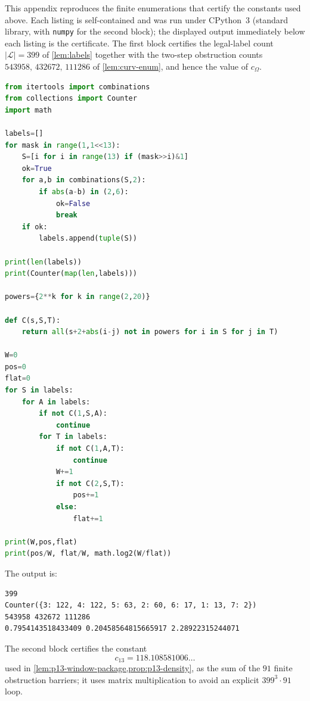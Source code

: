 \documentclass[11pt]{article}
\newcommand{\labels}{\mathcal L}
\begin{document}
This appendix reproduces the finite enumerations that certify the constants used above.  Each listing is self-contained and was run under CPython~3 (standard library, with \texttt{numpy} for the second block); the displayed output immediately below each listing is the certificate.  The first block certifies the legal-label count $|\labels|=399$ of \cref{lem:labels} together with the two-step obstruction counts $543958,\,432672,\,111286$ of \cref{lem:curv-enum}, and hence the value of $c_\Omega$.

\begin{lstlisting}[language=Python]
from itertools import combinations
from collections import Counter
import math

labels=[]
for mask in range(1,1<<13):
    S=[i for i in range(13) if (mask>>i)&1]
    ok=True
    for a,b in combinations(S,2):
        if abs(a-b) in (2,6):
            ok=False
            break
    if ok:
        labels.append(tuple(S))

print(len(labels))
print(Counter(map(len,labels)))

powers={2**k for k in range(2,20)}

def C(s,S,T):
    return all(s+2+abs(i-j) not in powers for i in S for j in T)

W=0
pos=0
flat=0
for S in labels:
    for A in labels:
        if not C(1,S,A):
            continue
        for T in labels:
            if not C(1,A,T):
                continue
            W+=1
            if not C(2,S,T):
                pos+=1
            else:
                flat+=1

print(W,pos,flat)
print(pos/W, flat/W, math.log2(W/flat))
\end{lstlisting}

The output is:
\begin{lstlisting}
399
Counter({3: 122, 4: 122, 5: 63, 2: 60, 6: 17, 1: 13, 7: 2})
543958 432672 111286
0.7954143518433409 0.20458564815665917 2.28922315244071
\end{lstlisting}

The second block certifies the constant
\[
 c_{13}=118.108581006\ldots
\]
used in \cref{lem:p13-window-package,prop:p13-density}, as the sum of the
$91$ finite obstruction barriers; it uses matrix multiplication to avoid an
explicit $399^3\cdot91$ loop.
\end{document}
